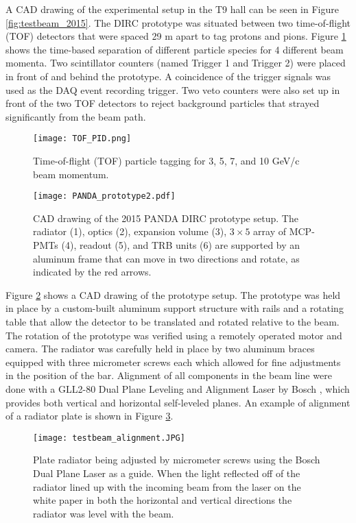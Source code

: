 A CAD drawing of the experimental setup in the T9 hall can be seen in Figure \ref{fig:testbeam_2015}. The DIRC prototype was situated between two time-of-flight (TOF) detectors that were spaced 29 m apart to tag protons and pions. Figure \ref{fig:TOF_PID} shows the time-based separation of different particle species for 4 different beam momenta. Two scintillator counters (named Trigger 1 and Trigger 2) were placed in front of and behind the prototype. A coincidence of the trigger signals was used as the DAQ event recording trigger. Two veto counters were also set up in front of the two TOF detectors to reject background particles that strayed significantly from the beam path.

\begin{figure}[!htb]
	\centering
	\texttt{[image: TOF\_PID.png]}
	\caption{Time-of-flight (TOF) particle tagging for 3, 5, 7, and 10 GeV/c beam momentum.}
	\label{fig:TOF_PID}
\end{figure}

\begin{figure}[!htb]
	\centering
	\texttt{[image: PANDA\_prototype2.pdf]}
	\caption{CAD drawing of the 2015 PANDA DIRC prototype setup. The radiator (1), optics (2), expansion volume (3), $3\times5$ array of MCP-PMTs (4), readout (5), and TRB units (6) are supported by an aluminum frame that can move in two directions and rotate, as indicated by the red arrows.}
	\label{fig:PANDA_prototype}
\end{figure}

Figure \ref{fig:PANDA_prototype} shows a CAD drawing of the prototype setup. The prototype was held in place by a custom-built aluminum support structure with rails and a rotating table that allow the detector to be translated and rotated relative to the beam. The rotation of the prototype was verified using a remotely operated motor and camera. The radiator was carefully held in place by two aluminum braces equipped with three micrometer screws each which allowed for fine adjustments in the position of the bar. Alignment of all components in the beam line were done with a GLL2-80 Dual Plane Leveling and Alignment Laser by Bosch \cite{BoschLaser}, which provides both vertical and horizontal self-leveled planes. An example of alignment of a radiator plate is shown in Figure \ref{fig:testbeam_alignment}. 

\begin{figure}[!htb]
	\centering
	\texttt{[image: testbeam\_alignment.JPG]}
	\caption{Plate radiator being adjusted by micrometer screws using the Bosch Dual Plane Laser as a guide. When the light reflected off of the radiator lined up with the incoming beam from the laser on the white paper in both the horizontal and vertical directions the radiator was level with the beam.}
	\label{fig:testbeam_alignment}
\end{figure}

